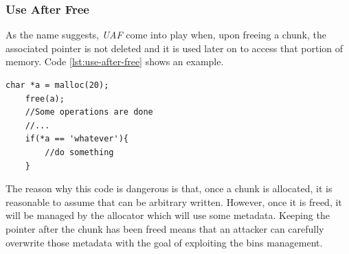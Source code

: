 \documentclass{article}
\numberwithin{equation}{subsection}
\begin{document}
\subsubsection{Use After Free}
As the name suggests, \emph{UAF} come into play when, upon freeing a chunk, the associated pointer is not deleted and it is used later on to access that portion of memory. Code \ref{lst:use-after-free} shows an example.\newline
\begin{minipage}{\textwidth}
\centering
    \lstset{style=cstyle}
    \begin{lstlisting}[caption={Use After Free vulnerable code.},captionpos=b,label={lst:use-after-free}]
    char *a = malloc(20);
    free(a);
    //Some operations are done
    //...
    if(*a == 'whatever'){
        //do something
    }
\end{lstlisting}
\end{minipage}
\noindent
The reason why this code is dangerous is that, once a chunk is allocated, it is reasonable to assume that can be arbitrary written. However, once it is freed, it will be managed by the allocator which will use some metadata. Keeping the pointer after the chunk has been freed means that an attacker can carefully overwrite those metadata with the goal of exploiting the bins management.
\end{document}
